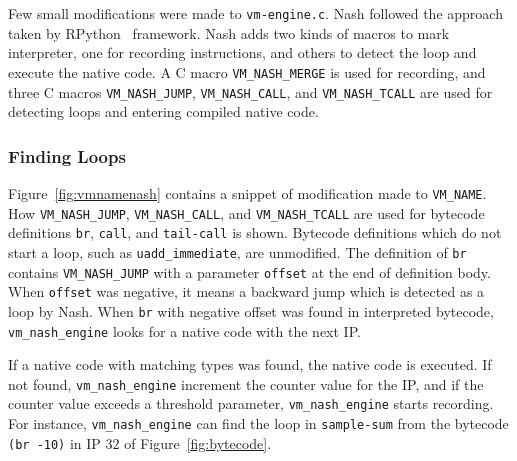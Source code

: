 \documentclass[preprint, 10pt]{sigplanconf}
\begin{document}
Few small modifications were made to \texttt{vm-engine.c}. Nash followed the
approach taken by RPython~\cite{bolz2009tracing} framework. Nash adds two kinds
of macros to mark interpreter, one for recording instructions, and others to
detect the loop and execute the native code. A C macro \texttt{VM\_NASH\_MERGE}
is used for recording, and three C macros \texttt{VM\_NASH\_JUMP},
\texttt{VM\_NASH\_CALL}, and \texttt{VM\_NASH\_TCALL} are used for detecting
loops and entering compiled native code.

\subsubsection{Finding Loops}

Figure~\hyperref[fig:vmnamenash]{\ref{fig:vmnamenash}} contains a snippet of
modification made to \texttt{VM\_NAME}. How \texttt{VM\_NASH\_JUMP},
\texttt{VM\_NASH\_CALL}, and \texttt{VM\_NASH\_TCALL} are used for bytecode
definitions \texttt{br}, \texttt{call}, and \texttt{tail-call} is shown.
Bytecode definitions which do not start a loop, such as
\texttt{uadd\_immediate}, are unmodified. The definition of \texttt{br} contains
\texttt{VM\_NASH\_JUMP} with a parameter \texttt{offset} at the end of
definition body. When \texttt{offset} was negative, it means a backward jump
which is detected as a loop by Nash. When \texttt{br} with negative offset was
found in interpreted bytecode, \texttt{vm\_nash\_engine} looks for a native code
with the next IP.\@


If a native code with matching types was found, the native code is executed. If
not found, \texttt{vm\_nash\_engine} increment the counter value for the IP, and
if the counter value exceeds a threshold parameter, \texttt{vm\_nash\_engine}
starts recording. For instance, \texttt{vm\_nash\_engine} can find the loop in
\texttt{sample-sum} from the bytecode \texttt{(br~-10)} in IP $32$ of
Figure~\hyperref[fig:bytecode]{\ref{fig:bytecode}}.
\end{document}
